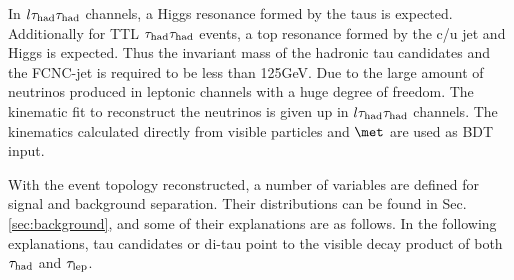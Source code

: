 In $l\tau_\text{had}{}\tau_\text{had}$ channels, a Higgs resonance formed by the taus is expected. Additionally for TTL $\tau_\text{had}{}\tau_\text{had}$ events, a top resonance formed by the c/u jet and Higgs is expected. Thus the invariant mass of the hadronic tau candidates and the FCNC-jet is required to be less than 125GeV.
Due to the large amount of neutrinos produced in leptonic channels with a huge degree of freedom. The kinematic fit to reconstruct the neutrinos is given up in $l\tau_\text{had}{}\tau_\text{had}$ channels. The kinematics calculated directly from visible particles and $\met$ are used as BDT input.

With the event topology reconstructed, a number of variables are defined for signal and background separation. Their distributions can be found in Sec. \ref{sec:background}, and some of their explanations are as follows. In the following explanations, tau candidates or di-tau point to the visible decay product of both $\tau_\text{had}$ and $\tau_\text{lep}$.

